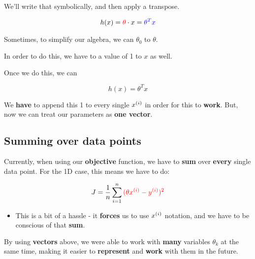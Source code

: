         We'll write that symbolically, and then apply a transpose.
        
        \begin{equation}
            h(x) = \textcolor{red}{\theta} \cdot x = \textcolor{blue}{ \theta^T x }
        \end{equation}
        
        \begin{concept}
            Sometimes, to simplify our algebra, we can  $\theta_0$ to $\theta$. 
            
            In order to do this, we have to  a value of 1 to $x$ as well.
            
            Once we do this, we can  
            
            \begin{equation*}
                h(x)=\theta^T x
            \end{equation*}
        \end{concept}
        
        We \textbf{have} to append this 1 to every single $x^{(i)}$ in order for this to \textbf{work}. But, now we can treat our parameters as \textbf{one vector}.
    
    \subsection{Summing over data points}
    
        Currently, when using our \textbf{objective} function, we have to \textbf{sum} over \textbf{every} single data point. For the 1D case, this means we have to do:
        
        \begin{equation}
            J = 
            \frac{1}{n}  \sum_{i=1}^n \textcolor{red}{(\theta x^{(i)}  - y^{(i)} )^2} 
        \end{equation}

        \begin{itemize}
            \item This is a bit of a hassle - it \textbf{forces} us to use $x^{(i)}$ notation, and we have to be conscious of that \textbf{sum}.
        \end{itemize}
        
        By using \textbf{vectors} above, we were able to work with \textbf{many} variables $\theta_k$ at the same time, making it easier to \textbf{represent} and \textbf{work} with them in the future. 
        
